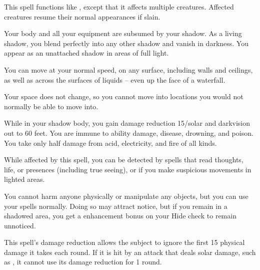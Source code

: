 \spellrng{\rngclose}
\begin{spelleffect}
  This spell functions like , except that it affects multiple creatures. Affected creatures resume their normal appearances if slain.
\end{spelleffect}

\begin{spelleffect}
  Your body and all your equipment are subsumed by your shadow. As a living shadow, you blend perfectly into any other shadow and vanish in darkness. You appear as an unattached shadow in areas of full light.
  \par You can move at your normal speed, on any surface, including walls and ceilings, as well as across the surfaces of liquids -- even up the face of a waterfall.
  \par Your space does not change, so you cannot move into locations you would not normally be able to move into.
  \par While in your shadow body, you gain damage reduction 15/solar and darkvision out to 60 feet. You are immune to ability damage, disease, drowning, and poison. You take only half damage from acid, electricity, and fire of all kinds.
  \par While affected by this spell, you can be detected by spells that read thoughts, life, or presences (including true seeing), or if you make suspicious movements in lighted areas.
  \par You cannot harm anyone physically or manipulate any objects, but you can use your spells normally. Doing so may attract notice, but if you remain in a shadowed area, you get a  enhancement bonus on your Hide check to remain unnoticed.
\end{spelleffect}
\begin{spellnotes}
  This spell's damage reduction allows the subject to ignore the first 15 physical damage it takes each round. If it is hit by an attack that deals solar damage, such as , it cannot use its damage reduction for 1 round.
\end{spellnotes}


